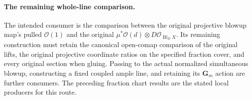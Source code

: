 \paragraph{The remaining whole-line comparison.}
The intended consumer is the comparison between the original projective
blowup map's pulled $\mathcal O(1)$ and the original
$\mu^*\mathcal O(d)\otimes D\mathcal O_{\operatorname{Bl}_D X}$.
Its remaining construction must retain the canonical open-comap comparison of
the original lifts, the original projective coordinate ratios on the specified
fraction cover, and every original section when gluing. Passing to the actual
normalized simultaneous blowup, constructing a fixed coupled ample line, and
retaining its $\mathbf G_m$ action are further consumers. The preceding fraction
chart results are the stated local producers for this route.
